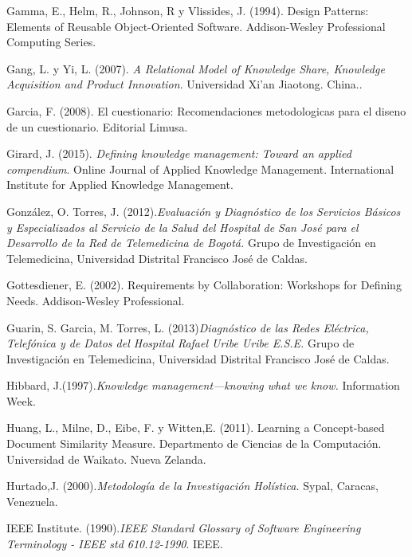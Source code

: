 \begin{thebibliography}{}
 Gamma, E., Helm, R., Johnson, R y Vlissides, J. (1994). Design Patterns: Elements of Reusable Object-Oriented Software. Addison-Wesley Professional Computing Series.

 Gang, L. y Yi, L. (2007). \textit{A Relational Model of Knowledge Share, Knowledge Acquisition and Product Innovation}. Universidad Xi'an Jiaotong. China..

 Garcia, F. (2008). El cuestionario: Recomendaciones metodologicas para el diseno de un cuestionario. Editorial Limusa.

 Girard, J. (2015). \textit{Defining knowledge management: Toward an applied compendium}. Online Journal of Applied Knowledge Management. International Institute for Applied Knowledge Management.

 González, O. Torres, J. (2012).\textit{Evaluación y Diagnóstico de los Servicios Básicos y Especializados al Servicio de la Salud del Hospital de San José para el Desarrollo de la Red de Telemedicina de Bogotá.} Grupo de Investigación en Telemedicina, Universidad Distrital Francisco José de Caldas.

 Gottesdiener, E. (2002). Requirements by Collaboration: Workshops for Defining Needs. Addison-Wesley Professional.

 Guarin, S. Garcia, M. Torres, L. (2013)\textit{Diagnóstico de las Redes Eléctrica, Telefónica y de Datos del Hospital Rafael Uribe Uribe E.S.E.} Grupo de Investigación en Telemedicina,  Universidad Distrital Francisco José de Caldas.

 Hibbard, J.(1997).\textit{Knowledge management—knowing what we know.} Information Week.

 Huang, L., Milne, D., Eibe, F. y Witten,E. (2011). Learning a Concept-based Document Similarity Measure. Departmento de Ciencias de la Computación. Universidad de Waikato. Nueva Zelanda.

 Hurtado,J. (2000).\textit{Metodología de la Investigación Holística.} Sypal, Caracas, Venezuela.


 IEEE Institute. (1990).\textit{IEEE Standard Glossary of Software Engineering Terminology - IEEE std 610.12-1990}. IEEE.


\end{thebibliography}
